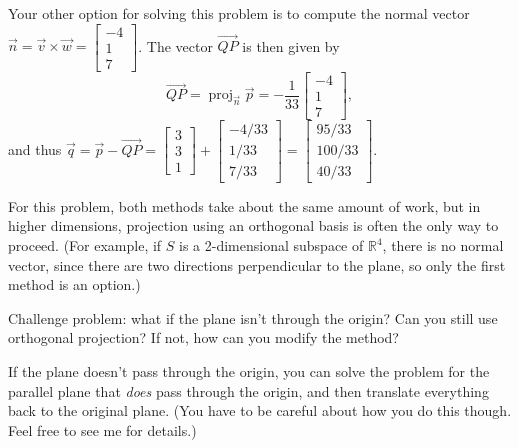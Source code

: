 \documentclass[12pt]{article}
\newcommand{\R}{\mathbb{R}}
\newcommand{\bbm}{\begin{bmatrix}}
\newcommand{\ebm}{\end{bmatrix}}
\DeclareMathOperator{\proj}{proj}
\begin{document}
\begin{enumerate}
Your other option for solving this problem is to compute the normal vector $\vec{n} = \vec{v}\times \vec{w} = \bbm -4\\1\\7\ebm$. The vector $\overrightarrow{QP}$ is then given by
\[
 \overrightarrow{QP} = \proj_{\vec{n}}\vec{p} = -\frac{1}{33}\bbm -4\\1\\7\ebm,
\]
and thus $\vec{q} = \vec{p}-\overrightarrow{QP} = \bbm 3\\3\\1\ebm +\bbm -4/33\\1/33\\7/33\ebm = \bbm 95/33\\100/33\\40/33\ebm$.

For this problem, both methods take about the same amount of work, but in higher dimensions, projection using an orthogonal basis is often the only way to proceed. (For example, if $S$ is a 2-dimensional subspace of $\R^4$, there is no normal vector, since there are two directions perpendicular to the plane, so only the first method is an option.)

Challenge problem: what if the plane isn't through the origin? Can you still use orthogonal projection? If not, how can you modify the method?

\bigskip

If the plane doesn't pass through the origin, you can solve the problem for the parallel plane that \textit{does} pass through the origin, and then translate everything back to the original plane. (You have to be careful about how you do this though. Feel free to see me for details.)
 \end{enumerate}
\end{document}
